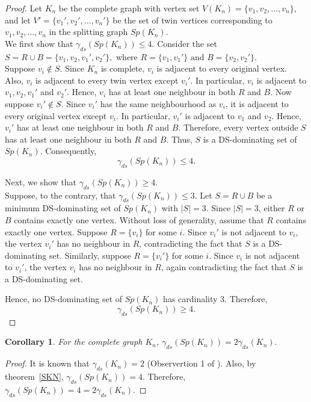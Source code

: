 \documentclass{article}
\newtheorem{corollary}{Corollary}[section]
\begin{document}
\begin{proof}
Let $K_n$ be the complete graph with vertex set $V(K_n)=\{v_1,v_2,\ldots,v_n\}$,
and let $V'=\{v_1',v_2',\ldots,v_n'\}$
be the set of twin vertices corresponding to $v_1,v_2,\ldots,v_n$ in the splitting graph $Sp(K_n)$.\\
We first show that $
\gamma_{ds}(Sp(K_n))\le 4.$
Consider the set $
S=R \cup B=\{v_1,v_2,v_1',v_2'\},$
where $R=\{v_1,v_1'\} \text{ and } B=\{v_2,v_2'\}.$\\
Suppose $v_i\notin S$. Since $K_n$ is complete, $v_i$ is adjacent to every original vertex. Also, $v_i$ is adjacent to every twin vertex except $v_i'$. In particular, $v_i$ is adjacent to $v_1,v_2,v_1'$ and $v_2'$. Hence, $v_i$ has at least one neighbour in both $R$ and $B$.
Now suppose $v_i'\notin S$. Since $v_i'$ has the same neighbourhood as $v_i$, it is adjacent to every original vertex except $v_i$. In particular, $v_i'$ is adjacent to $v_1$ and $v_2$. Hence, $v_i'$ has at least one neighbour in both $R$ and $B$.
Therefore, every vertex outside $S$ has at least one neighbour in both $R$ and $B$. Thus, $S$ is a DS-dominating set of $Sp(K_n)$. Consequently, \[
\gamma_{ds}(Sp(K_n))\le 4.\]

Next, we show that $
\gamma_{ds}(Sp(K_n))\ge 4.$\\
Suppose, to the contrary, that $\gamma_{ds}(Sp(K_n))\le 3.$
Let $S=R\cup B$
be a minimum DS-dominating set  of $Sp(K_n)$ with $|S|=3$.
Since $|S|=3$, either $R$ or $B$ contains exactly one vertex. Without loss of generality, assume that $R$ contains exactly one vertex.
Suppose $R=\{v_i\}$
for some $i$. Since $v_i'$ is not adjacent to $v_i$, the vertex $v_i'$ has no neighbour in $R$, contradicting the fact that $S$ is a DS-dominating set.
Similarly, suppose $R=\{v_i'\}$
for some $i$. Since $v_i$ is not adjacent to $v_i'$, the vertex $v_i$ has no neighbour in $R$, again contradicting the fact that $S$ is a DS-dominating set.

Hence, no DS-dominating set of $Sp(K_n)$ has cardinality 3. Therefore,
\[
\gamma_{ds}(Sp(K_n))\ge 4.
\]
\end{proof}
\begin{corollary}
For the complete graph $K_n$, $\gamma_{ds}(Sp(K_n))= 2\gamma_{ds}(K_n).$
\end{corollary}
\begin{proof}
It is known that $\gamma_{ds}(K_n)= 2$ (Observertion 1 of \cite{DS}). Also, by theorem~\ref{SKN}, $\gamma_{ds}(Sp(K_n))= 4$. Therefore, $\gamma_{ds}(Sp(K_n))= 4= 2\gamma_{ds}(K_n).$
\end{proof}
\end{document}
